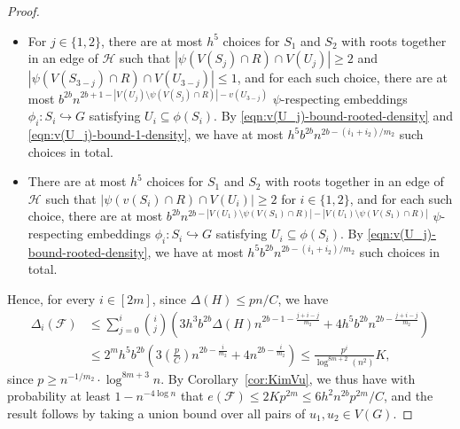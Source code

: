 \documentclass[11pt]{article}
\numberwithin{equation}{section}
\newcounter{i}
\theoremstyle{plain}
\theoremstyle{plain} %
\theoremstyle{definition}
\newcommand{\cF}{\mathcal{F}}
\newcommand{\cH}{\mathcal{H}}
\begin{document}
\begin{proof}
\begin{itemize}
    By \eqref{eqn:v(U_j)-bound-1-density}, we have at most
    $h^5b^{2b}n^{2b - (i_1 + i_2)/m_2}$ such choices in total.
    \item For $j \in \{1,2\}$, there are at most $h^5$ choices for $S_1$ and $S_2$ with roots together in an edge of $\cH$  such that $|\psi(V(S_j) \cap R) \cap V(U_j)| \geq 2$ and $|\psi(V(S_{3-j}) \cap R) \cap V(U_{3-j})| \leq 1$, and for each such choice, there are at most $b^{2b}n^{2b + 1 - |V(U_j)\setminus \psi(V(S_j)\cap R)| - v(U_{3-j})}$ $\psi$-respecting embeddings $\phi_i : S_i \hookrightarrow G$ satisfying $U_i \subseteq \phi(S_i)$.
    By \eqref{eqn:v(U_j)-bound-rooted-density} and \eqref{eqn:v(U_j)-bound-1-density}, we have at most %
    $h^5 b^{2b}n^{2b - (i_1 + i_2)/m_2}$ such choices in total.
    \item There are at most $h^5$ choices for $S_1$ and $S_2$ with roots together in an edge of $\cH$ such that $|\psi(v(S_i) \cap R) \cap V(U_i)| \geq 2$ for $i \in \{1,2\}$, and for each such choice, there are at most $b^{2b}n^{2b - |V(U_1)\setminus \psi(V(S_1)\cap R)| - |V(U_1)\setminus \psi(V(S_1)\cap R)|}$ $\psi$-respecting embeddings $\phi_i : S_i \hookrightarrow G$ satisfying $U_i \subseteq \phi(S_i)$.
    By \eqref{eqn:v(U_j)-bound-rooted-density}, we have at most $h^5b^{2b}n^{2b - (i_1 + i_2)/m_2}$ such choices in total.
\end{itemize}
Hence, for every $i \in [2m]$, since $\Delta(H) \leq pn / C$, we have 
\begin{align*} %
    \Delta_i(\cF) &\leq \sum_{j = 0}^i\binom{i}{j}\left(
    3h^3b^{2b}\Delta(H)n^{2b - 1 - \frac{j + i - j}{m_2} } + 
    4h^5b^{2b}n^{2b - \frac{j + i - j}{m_2}}\right)\\
    & \leq 2^m h^5 b^{2b}\left(3\left(\frac{p}{C}\right)n^{2b-\frac{i}{m_2}} + 4 n^{2b-\frac{i}{m_2}}\right)
     \leq \frac{p^i}{\log^{8m+2}(n^2)}K,
\end{align*}
since $p \geq n^{-1/m_2} \cdot \log^{8m+3}n$.
By Corollary~\ref{cor:KimVu}, we thus have with probability at least $1-n^{-4\log n}$ that $e(\cF) \leq 2Kp^{2m} \leq 6h^2n^{2b} p^{2m} / C$, and the result follows by taking a union bound over all pairs of $u_1,u_2 \in V(G)$.
\end{proof}
\end{document}
